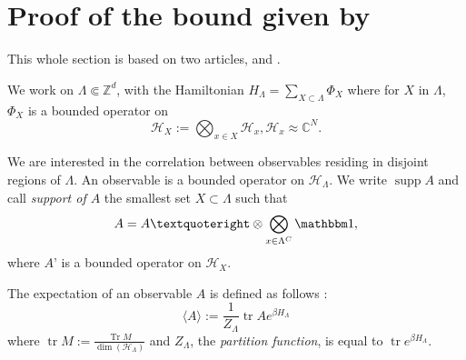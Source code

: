 \documentclass{article}
\DeclareMathOperator{\Tr}{Tr}
\DeclareMathOperator{\tr}{tr}
\DeclareMathOperator{\Hess}{Hess}
\DeclareMathOperator{\supp}{supp}
\begin{document}
%
% 
% 
 \section{Proof of the bound given by \cite{froehlichPropertiesCorrelationsQuantum2015}}
 
 This whole section is based on two articles, \cite{froehlichPropertiesCorrelationsQuantum2015} and \cite{ueltschiClusterExpansionsCorrelation2005}.
 
 We work on $\Lambda\Subset \mathbb{Z}^d$, with the Hamiltonian $H_\Lambda=\sum_{X\subset \Lambda} \Phi_X$ where for $X$ in $\Lambda$, $\Phi_X$ is a bounded operator on $$\mathcal H_X:=\bigotimes_{x\in X}\mathcal H_x, \mathcal{H}_x\approx\mathbb C^N.$$
 
 We are interested in the correlation between observables residing in disjoint regions of $\Lambda$.
 An observable is a bounded operator on $\mathcal H_\Lambda$.
 We write $\supp A$ and call {\it support of $A$} the smallest set $X\subset \Lambda$ such that $$A=A’\otimes\bigotimes_{x\in \Lambda^C}\mathbbm 1,$$ where $A’$ is a bounded operator on $\mathcal H_X$.
 
 The expectation of an observable $A$ is defined as follows :
 $$
 \langle A \rangle := \frac{1}{Z_\Lambda}\tr Ae^{\beta H_\Lambda}
 $$
 where $\tr M:=\frac{\Tr M}{\dim(\mathcal H_\Lambda)}$ and $Z_\Lambda$, the {\it partition function}, is equal to $\tr e^{\beta H_\Lambda}$.
 
\end{document}
